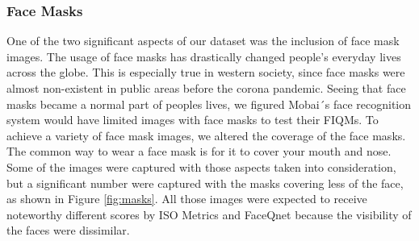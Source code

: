 \subsubsection*{Face Masks}
One of the two significant aspects of our dataset was the inclusion of face mask images. The usage of face masks has drastically changed people's everyday lives across the globe. This is especially true in western society, since face masks were almost non-existent in public areas before the corona pandemic. Seeing that face masks became a normal part of peoples lives, we figured Mobai´s face recognition system would have limited images with face masks to test their FIQMs. 
To achieve a variety of face mask images, we altered the coverage of the face masks. The common way to wear a face mask is for it to cover your mouth and nose. Some of the images were captured with those aspects taken into consideration, but a significant number were captured with the masks covering less of the face, as shown in Figure \ref{fig:masks}. All those images were expected to receive noteworthy different scores by ISO Metrics and FaceQnet because the visibility of the faces were dissimilar.  
